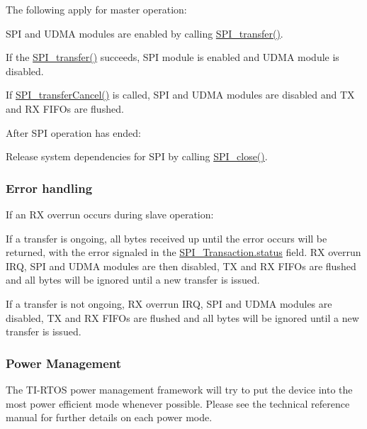The following apply for master operation\+:
\begin{DoxyItemize}
\item S\+P\+I and U\+D\+M\+A modules are enabled by calling \hyperlink{_s_p_i_8h_a989e17f96b54fcc3dc2cac5f8ac6bdb2}{S\+P\+I\+\_\+transfer()}.
\item If the \hyperlink{_s_p_i_8h_a989e17f96b54fcc3dc2cac5f8ac6bdb2}{S\+P\+I\+\_\+transfer()} succeeds, S\+P\+I module is enabled and U\+D\+M\+A module is disabled.
\item If \hyperlink{_s_p_i_8h_a6819f7761fc3505c4f885653ff8121f0}{S\+P\+I\+\_\+transfer\+Cancel()} is called, S\+P\+I and U\+D\+M\+A modules are disabled and T\+X and R\+X F\+I\+F\+Os are flushed.
\end{DoxyItemize}After S\+P\+I operation has ended\+:
\begin{DoxyItemize}
\item Release system dependencies for S\+P\+I by calling \hyperlink{_s_p_i_8h_a0e3448b30b88609fa120915e49560601}{S\+P\+I\+\_\+close()}.
\end{DoxyItemize}

\subsubsection*{Error handling}

If an R\+X overrun occurs during slave operation\+:
\begin{DoxyItemize}
\item If a transfer is ongoing, all bytes received up until the error occurs will be returned, with the error signaled in the \hyperlink{struct_s_p_i___transaction_aa244504b2384411f7de17340be62128a}{S\+P\+I\+\_\+\+Transaction.\+status} field. R\+X overrun I\+R\+Q, S\+P\+I and U\+D\+M\+A modules are then disabled, T\+X and R\+X F\+I\+F\+Os are flushed and all bytes will be ignored until a new transfer is issued.
\item If a transfer is not ongoing, R\+X overrun I\+R\+Q, S\+P\+I and U\+D\+M\+A modules are disabled, T\+X and R\+X F\+I\+F\+Os are flushed and all bytes will be ignored until a new transfer is issued.
\end{DoxyItemize}

\subsubsection*{Power Management}

The T\+I-\/\+R\+T\+O\+S power management framework will try to put the device into the most power efficient mode whenever possible. Please see the technical reference manual for further details on each power mode.

